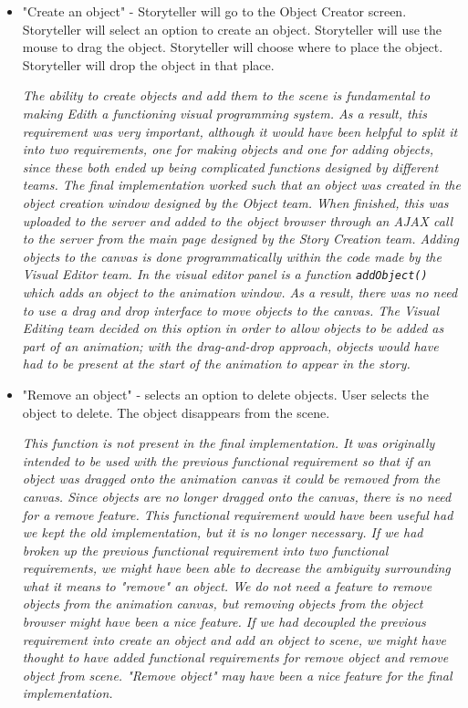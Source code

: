 \documentclass[12pt]{article}
\begin{document}
\begin{itemize}
\item "Create an object" - Storyteller will go to the Object Creator screen. Storyteller will select an option to create an object.  Storyteller will use the mouse to drag the object. Storyteller will choose where to place the object. Storyteller will drop the object in that place.\

\textit{ The ability to create objects and add them to the scene is fundamental to making Edith a functioning visual programming system. As a result, this requirement was very important, although it would have been helpful to split it into two requirements, one for making objects and one for adding objects, since these both ended up being complicated functions designed by different teams. The final implementation worked such that an object was created in the object creation window designed by the Object team. When finished, this was uploaded to the server and added to the object browser through an AJAX call to the server from the main page designed by the Story Creation team. Adding objects to the canvas is done programmatically within the code made by the Visual Editor team. In the visual editor panel is a function \texttt{addObject()} which adds an object to the animation window. As a result, there was no need to use a drag and drop interface to move objects to the canvas. The Visual Editing team decided on this option in order to allow objects to be added as part of an animation; with the drag-and-drop approach, objects would have had to be present at the start of the animation to appear in the story.}

\item "Remove an object" - selects an option to delete objects. User selects the object to delete. The object disappears from the scene.\

\textit{ This function is not present in the final implementation. It was originally intended to be used with the previous functional requirement so that if an object was dragged onto the animation canvas it could be removed from the canvas. Since objects are no longer dragged onto the canvas, there is no need for a remove feature. This functional requirement would have been useful had we kept the old implementation, but it is no longer necessary. If we had broken up the previous functional requirement into two functional requirements, we might have been able to decrease the ambiguity surrounding what it means to "remove" an object. We do not need a feature to remove objects from the animation canvas, but removing objects from the object browser might have been a nice feature. If we had decoupled the previous requirement into create an object and add an object to scene, we might have thought to have added functional requirements for remove object and remove object from scene. "Remove object" may have been a nice feature for the final implementation.}


\end{itemize}
\end{document}
